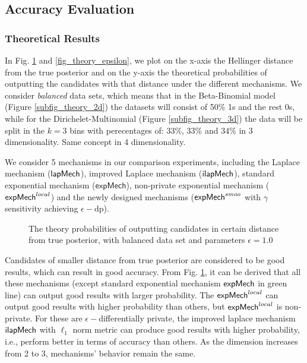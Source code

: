 \documentclass{article}
\begin{document}
\subsection{Accuracy Evaluation}
\subsubsection{Theoretical Results}
In Fig. \ref{fig_theory} and \ref{fig_theory_epsilon}, we plot on the x-axis the Hellinger distance from the true posterior and on the y-axis the theoretical probabilities of outputting the candidates with that distance under the different mechanisms. We consider \emph{balanced} data sets, which means that in the Beta-Binomial model (Figure \ref{subfig_theory_2d}) the datasets will consist of 50\% 1s and the rest 0s, while for the
Dirichelet-Multinomial (Figure  \ref{subfig_theory_3d})
the data will be split in the $k=3$ bins with perecentages of: 33\%, 33\% and 34\% in 3 dimensionality. Same concept in 4 dimensionality.

We consider 5 mechanisms in our comparison experiments, including the Laplace mechanism ($\mathsf{lapMech}$), improved Laplace mechanism ($\mathsf{ilapMech}$), standard exponential mechanism ($\mathsf{expMech}$), non-private exponential mechanism ($\mathsf{expMech}^{local}$) and the newly designed mechanisms ($\mathsf{expMech}^{smoo}$ with $\gamma$ sensitivity achieving $\epsilon-$dp).

\begin{figure}
\begin{center}
\centering
\caption{The theory probabilities of outputting candidates in certain distance from true posterior, with balanced data set and parameters $\epsilon = 1.0$}
\label{fig_theory}
\end{center}
\end{figure}

Candidates of smaller distance from true posterior are considered to be good results, which can result in good accuracy. From Fig. \ref{fig_theory}, it can be derived that all these mechanisms (except standard exponential mechanism $\mathsf{expMech}$ in green line) can output good results with larger probability. The $\mathsf{expMech}^{local}$ can output good results with higher probability than others, but $\mathsf{expMech}^{local}$ is non-private. For these are $\epsilon -$differentially private, the improved laplace mechanism $\mathsf{ilapMech}$ with $\ell_1$ norm metric can produce good results with higher probability, i.e., perform better in terms of accuracy than others. As the dimension increases from 2 to 3, mechanisms' behavior remain the same.
\end{document}
